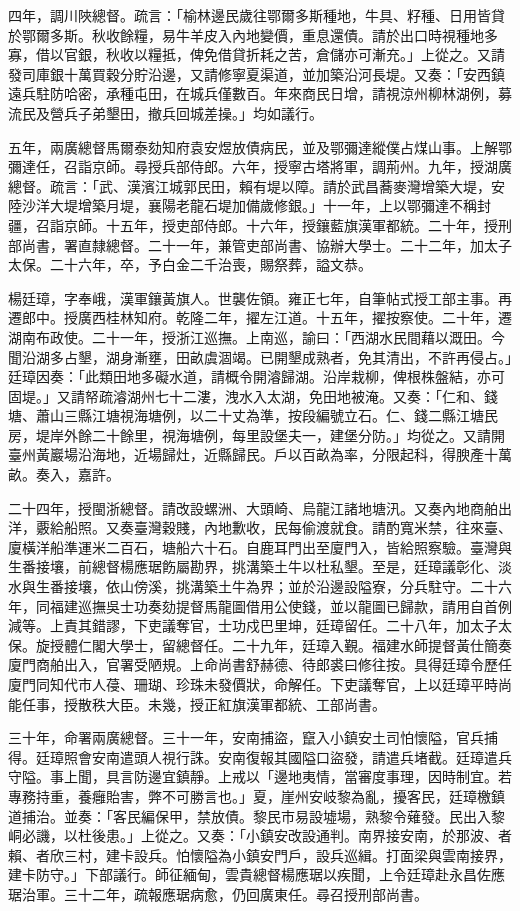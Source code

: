 \begin{pinyinscope}
四年，調川陜總督。疏言：「榆林邊民歲往鄂爾多斯種地，牛具、籽種、日用皆貸於鄂爾多斯。秋收餘糧，易牛羊皮入內地變價，重息還債。請於出口時視種地多寡，借以官銀，秋收以糧抵，俾免借貸折耗之苦，倉儲亦可漸充。」上從之。又請發司庫銀十萬買穀分貯沿邊，又請修寧夏渠道，並加築沿河長堤。又奏：「安西鎮遠兵駐防哈密，承種屯田，在城兵僅數百。年來商民日增，請視涼州柳林湖例，募流民及營兵子弟墾田，撤兵回城差操。」均如議行。

五年，兩廣總督馬爾泰劾知府袁安煜放債病民，並及鄂彌達縱僕占煤山事。上解鄂彌達任，召詣京師。尋授兵部侍郎。六年，授寧古塔將軍，調荊州。九年，授湖廣總督。疏言：「武、漢濱江城郭民田，賴有堤以障。請於武昌蕎麥灣增築大堤，安陸沙洋大堤增築月堤，襄陽老龍石堤加備歲修銀。」十一年，上以鄂彌達不稱封疆，召詣京師。十五年，授吏部侍郎。十六年，授鑲藍旗漢軍都統。二十年，授刑部尚書，署直隸總督。二十一年，兼管吏部尚書、協辦大學士。二十二年，加太子太保。二十六年，卒，予白金二千治喪，賜祭葬，謚文恭。

楊廷璋，字奉峨，漢軍鑲黃旗人。世襲佐領。雍正七年，自筆帖式授工部主事。再遷郎中。授廣西桂林知府。乾隆二年，擢左江道。十五年，擢按察使。二十年，遷湖南布政使。二十一年，授浙江巡撫。上南巡，諭曰：「西湖水民間藉以溉田。今聞沿湖多占墾，湖身漸壅，田畝虞涸竭。已開墾成熟者，免其清出，不許再侵占。」廷璋因奏：「此類田地多礙水道，請概令開濬歸湖。沿岸栽柳，俾根株盤結，亦可固堤。」又請帑疏濬湖州七十二漊，洩水入太湖，免田地被淹。又奏：「仁和、錢塘、蕭山三縣江塘視海塘例，以二十丈為準，按段編號立石。仁、錢二縣江塘民房，堤岸外餘二十餘里，視海塘例，每里設堡夫一，建堡分防。」均從之。又請開臺州黃巖場沿海地，近場歸灶，近縣歸民。戶以百畝為率，分限起科，得腴產十萬畝。奏入，嘉許。

二十四年，授閩浙總督。請改設螺洲、大頭崎、烏龍江諸地塘汛。又奏內地商舶出洋，覈給船照。又奏臺灣穀賤，內地歉收，民每偷渡就食。請酌寬米禁，往來臺、廈橫洋船準運米二百石，塘船六十石。自鹿耳門出至廈門入，皆給照察驗。臺灣與生番接壤，前總督楊應琚飭屬勘界，挑溝築土牛以杜私墾。至是，廷璋議彰化、淡水與生番接壤，依山傍溪，挑溝築土牛為界；並於沿邊設隘寮，分兵駐守。二十六年，同福建巡撫吳士功奏劾提督馬龍圖借用公使錢，並以龍圖已歸款，請用自首例減等。上責其錯謬，下吏議奪官，士功戍巴里坤，廷璋留任。二十八年，加太子太保。旋授體仁閣大學士，留總督任。二十九年，廷璋入覲。福建水師提督黃仕簡奏廈門商舶出入，官署受陋規。上命尚書舒赫德、待郎裘曰修往按。具得廷璋令歷任廈門同知代市人葠、珊瑚、珍珠未發價狀，命解任。下吏議奪官，上以廷璋平時尚能任事，授散秩大臣。未幾，授正紅旗漢軍都統、工部尚書。

三十年，命署兩廣總督。三十一年，安南捕盜，竄入小鎮安土司怕懷隘，官兵捕得。廷璋照會安南遣頭人視行誅。安南復報其國隘口盜發，請遣兵堵截。廷璋遣兵守隘。事上聞，具言防邊宜鎮靜。上戒以「邊地夷情，當審度事理，因時制宜。若專務持重，養癰貽害，弊不可勝言也。」夏，崖州安岐黎為亂，擾客民，廷璋檄鎮道捕治。並奏：「客民編保甲，禁放債。黎民市易設墟場，熟黎令薙發。民出入黎峒必譏，以杜後患。」上從之。又奏：「小鎮安改設通判。南界接安南，於那波、者賴、者欣三村，建卡設兵。怕懷隘為小鎮安門戶，設兵巡緝。打面梁與雲南接界，建卡防守。」下部議行。師征緬甸，雲貴總督楊應琚以疾聞，上令廷璋赴永昌佐應琚治軍。三十二年，疏報應琚病愈，仍回廣東任。尋召授刑部尚書。


\end{pinyinscope}
